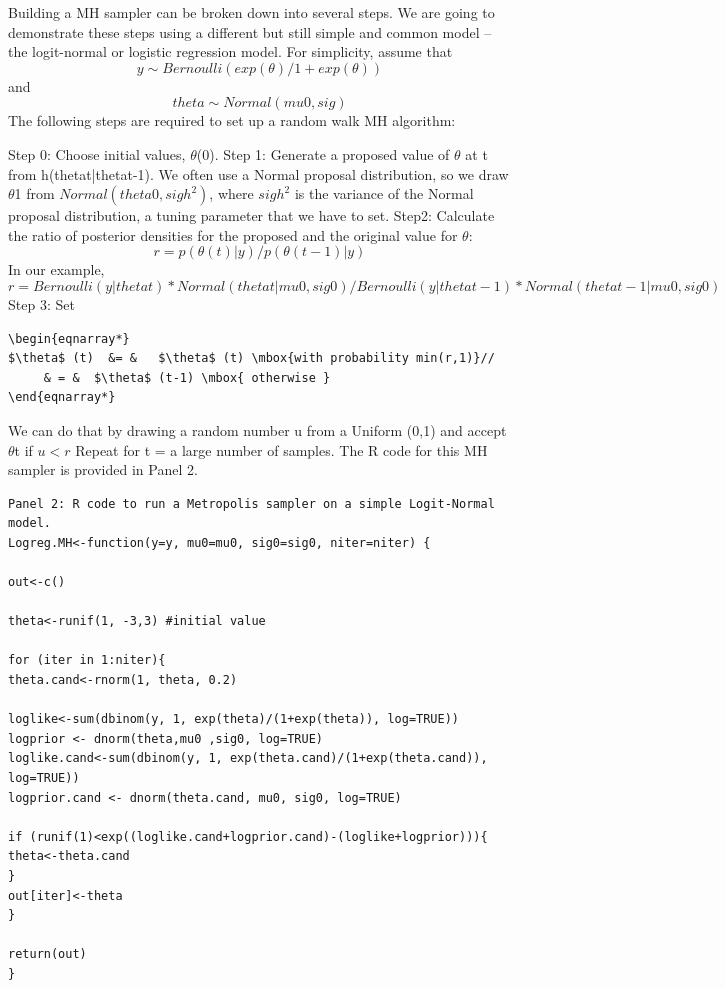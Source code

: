 Building a MH sampler can be broken down into several steps. We are going to demonstrate these steps using a different but still simple and common model – the logit-normal or logistic regression model. For simplicity, assume that 
\[
y \sim Bernoulli(exp(\theta)/1+ exp(\theta))   
\]
and 
\[ 
theta \sim Normal (mu0, sig)
\]
The following steps are required to set up a random walk MH algorithm:

{\flushleft Step 0: Choose initial values, $\theta$(0).}
{\flushleft Step 1: Generate a proposed value of $\theta$ at t from h(thetat|thetat-1). }
We often use a Normal proposal distribution, so we draw $\theta$1 from $Normal(theta0, sigh^2)$, where $sigh^2$ is the variance of the Normal proposal distribution, a tuning parameter  that we have to set. 
{\flushleft Step2: Calculate the ratio of posterior densities for the proposed and the original value for $\theta$: }
\[
r = p(\theta(t)|y) / p(\theta(t-1)|y)
\]
In our example, 
\[
r = Bernoulli(y|thetat) * Normal(thetat|mu0, sig0) / Bernoulli(y|thetat-1) * Normal(thetat-1|mu0, sig0)
\]
Step 3: Set 
\begin{verbatim}
\begin{eqnarray*}
$\theta$ (t)  &= &   $\theta$ (t) \mbox{with probability min(r,1)}//
	 & = & 	$\theta$ (t-1) \mbox{ otherwise }
\end{eqnarray*}
\end{verbatim}


We can do that by drawing a random number u from a Uniform (0,1) and accept $\theta$t if $u<r$
Repeat for t = a large number of samples. 
The R code for this MH sampler is provided in Panel 2.
\begin{verbatim}
Panel 2: R code to run a Metropolis sampler on a simple Logit-Normal model.
Logreg.MH<-function(y=y, mu0=mu0, sig0=sig0, niter=niter) {

out<-c()

theta<-runif(1, -3,3) #initial value

for (iter in 1:niter){
theta.cand<-rnorm(1, theta, 0.2)

loglike<-sum(dbinom(y, 1, exp(theta)/(1+exp(theta)), log=TRUE)) 
logprior <- dnorm(theta,mu0 ,sig0, log=TRUE)
loglike.cand<-sum(dbinom(y, 1, exp(theta.cand)/(1+exp(theta.cand)), log=TRUE))
logprior.cand <- dnorm(theta.cand, mu0, sig0, log=TRUE)

if (runif(1)<exp((loglike.cand+logprior.cand)-(loglike+logprior))){
theta<-theta.cand
}
out[iter]<-theta
}

return(out)
}
\end{verbatim}

